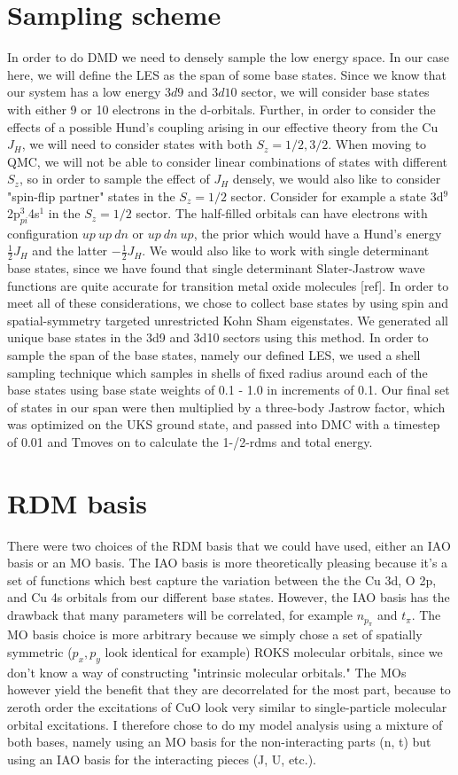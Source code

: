 \documentclass{article}
\begin{document}
\section{Sampling scheme}
In order to do DMD we need to densely sample the low energy space. In our case here, we will define the LES as the span of some base states. Since we know that our system has a low energy $3d9$ and $3d10$ sector, we will consider base states with either 9 or 10 electrons in the d-orbitals. Further, in order to consider the effects of a possible Hund's coupling arising in our effective theory from the Cu $J_H$, we will need to consider states with both $S_z=1/2, 3/2$. When moving to QMC, we will not be able to consider linear combinations of states with different $S_z$, so in order to sample the effect of $J_H$ densely, we would also like to consider "spin-flip partner" states in the $S_z=1/2$ sector. Consider for example a state 3d$^9$2p$_{pi}^3$4s$^1$ in the $S_z=1/2$ sector. The half-filled orbitals can have electrons with configuration $up\ up\ dn$ or $up\ dn\ up$, the prior which would have a Hund's energy $\frac{1}{2}J_H$ and the latter $-\frac{1}{2}J_H$. We would also like to work with single determinant base states, since we have found that single determinant Slater-Jastrow wave functions are quite accurate for transition metal oxide molecules [ref]. In order to meet all of these considerations, we chose to collect base states by using spin and spatial-symmetry targeted unrestricted Kohn Sham eigenstates. We generated all unique base states in the 3d9 and 3d10 sectors using this method. In order to sample the span of the base states, namely our defined LES, we used a shell sampling technique which samples in shells of fixed radius around each of the base states using base state weights of 0.1 - 1.0 in increments of 0.1. Our final set of states in our span were then multiplied by a three-body Jastrow factor, which was optimized on the UKS ground state, and passed into DMC with a timestep of 0.01 and Tmoves on to calculate the 1-/2-rdms and total energy.

\section{RDM basis}
There were two choices of the RDM basis that we could have used, either an IAO basis or an MO basis. The IAO basis is more theoretically pleasing because it's a set of functions which best capture the variation between the the Cu 3d, O 2p, and Cu 4s orbitals from our different base states. However, the IAO basis has the drawback that many parameters will be correlated, for example $n_{p_\pi}$ and $t_\pi$. The MO basis choice is more arbitrary because we simply chose a set of spatially symmetric ($p_x, p_y$ look identical for example) ROKS molecular orbitals, since we don't know a way of constructing "intrinsic molecular orbitals." The MOs however yield the benefit that they are decorrelated for the most part, because to zeroth order the excitations of CuO look very similar to single-particle molecular orbital excitations. I therefore chose to do my model analysis using a mixture of both bases, namely using an MO basis for the non-interacting parts (n, t) but using an IAO basis for the interacting pieces (J, U, etc.).
\end{document}
